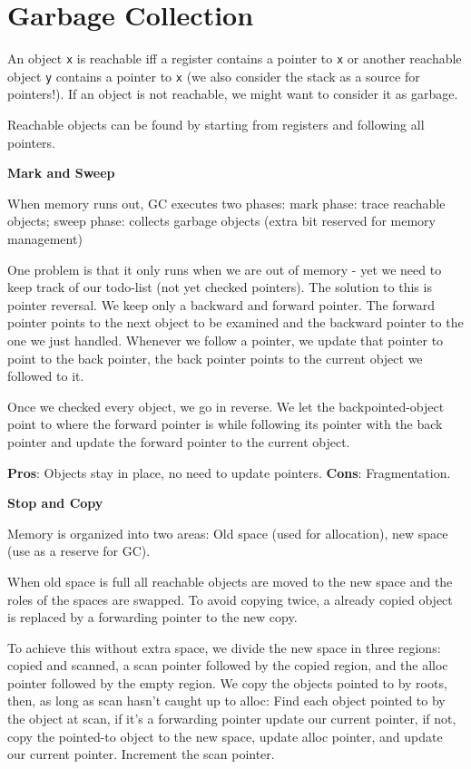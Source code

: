\section*{Garbage Collection}

An object \texttt{x} is reachable iff a register contains a pointer to \texttt{x} or another reachable object \texttt{y} contains a pointer to \texttt{x} (we also consider the stack as a source for pointers!). If an object is not reachable, we might want to consider it as garbage. \medskip
	
Reachable objects can be found by starting from registers and following all pointers. \medskip

\textbf{Mark and Sweep} \smallskip
	
When memory runs out, GC executes two phases: mark phase: trace reachable objects; sweep phase: collects garbage objects (extra bit reserved for memory management)\medskip
	
One problem is that it only runs when we are out of memory - yet we need to keep track of our todo-list (not yet checked pointers). The solution to this is pointer reversal. We keep only a backward and forward pointer. The forward pointer points to the next object to be examined and the backward pointer to the one we just handled. Whenever we follow a pointer, we update that pointer to point to the back pointer, the back pointer points to the current object we followed to it. \medskip 

Once we checked every object, we go in reverse. We let the backpointed-object point to where the forward pointer is while following its pointer with the back pointer and update the forward pointer to the current object. \medskip

\textbf{Pros}: Objects stay in place, no need to update pointers. \textbf{Cons}: Fragmentation.\medskip
	
\textbf{Stop and Copy} \smallskip
	
Memory is organized into two areas: Old space (used for allocation), new space (use as a reserve for GC). \medskip
	
When old space is full all reachable objects are moved to the new space and the roles of the spaces are swapped. To avoid copying twice, a already copied object is replaced by a forwarding pointer to the new copy. \medskip

To achieve this without extra space, we divide the new space in three regions: copied and scanned, a scan pointer followed by the copied region, and the alloc pointer followed by the empty region. We copy the objects pointed to by roots, then, as long as scan hasn't caught up to alloc: Find each object pointed to by the object at scan, if it's a forwarding pointer update our current pointer, if not, copy the pointed-to object to the new space, update alloc pointer, and update our current pointer. Increment the scan pointer. \medskip

